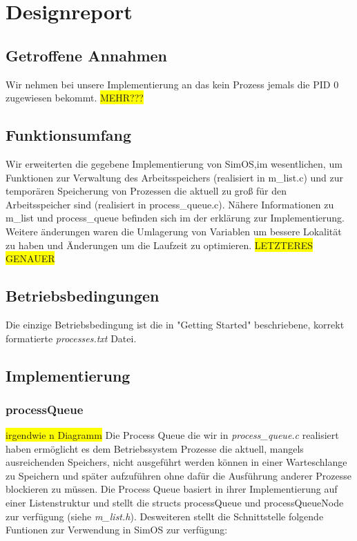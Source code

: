 \section{Designreport}
\subsection{Getroffene Annahmen}
Wir nehmen bei unsere Implementierung an das kein Prozess jemals die PID 0 zugewiesen bekommt.
\colorbox{yellow}{MEHR???}

\subsection{Funktionsumfang}
Wir erweiterten die gegebene Implementierung von SimOS,im wesentlichen,  um Funktionen zur Verwaltung des Arbeitsspeichers (realisiert in m\_list.c) und zur temporären Speicherung von Prozessen die aktuell zu groß für den Arbeitsspeicher sind (realisiert in process\_queue.c).
Nähere Informationen zu m\_list und process\_queue befinden sich im der erklärung zur Implementierung.
Weitere änderungen waren die Umlagerung von Variablen um bessere Lokalität zu haben und Änderungen um die Laufzeit zu optimieren.
\colorbox{yellow}{LETZTERES GENAUER}  

\subsection{Betriebsbedingungen}
Die einzige Betriebsbedingung ist die in "Getting Started" beschriebene, korrekt formatierte \textit{processes.txt} Datei. 


\subsection{Implementierung}

\subsubsection{processQueue}
\colorbox{yellow}{irgendwie n Diagramm}
Die Process Queue die wir in \textit{process\_queue.c} realisiert haben ermöglicht es dem Betriebssystem Prozesse die aktuell, mangels ausreichenden Speichers, nicht ausgeführt werden können in einer Warteschlange zu Speichern und später aufzuführen ohne dafür die Ausführung anderer Prozesse blockieren zu müssen.
Die Process Queue basiert in ihrer Implementierung auf einer Listenstruktur und stellt die structs processQueue und processQueueNode zur verfügung (siehe \textit{m\_list.h}).
Desweiteren stellt die Schnittstelle folgende Funtionen zur Verwendung in SimOS zur verfügung:

